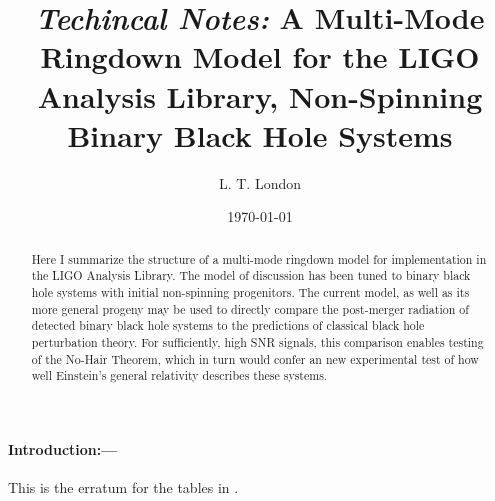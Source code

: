 \documentclass[twocolumn,prd,floatfix,preprintnumbers,a4paper,nofootinbib,superscriptaddress]{revtex4-1}
\begin{document}

\title{\textit{Techincal Notes:} A Multi-Mode Ringdown Model for the LIGO Analysis Library, Non-Spinning Binary Black Hole Systems}

\author{L. T. London}

\begin{abstract}
	Here I summarize the structure of a multi-mode ringdown model for implementation in the LIGO Analysis Library. The model of discussion has been tuned to binary black hole systems with initial non-spinning progenitors. The current model, as well as its more general progeny may be used to directly compare the post-merger radiation of detected binary black hole systems to the predictions of classical black hole perturbation theory. For sufficiently, high SNR signals, this comparison enables testing of the No-Hair Theorem, which in turn would confer an new experimental test of how well Einstein's general relativity describes these systems.
\end{abstract}

\date{\today}

\maketitle

\paragraph{Introduction:---}
%
\par This is the erratum for the tables in \cite{London:2014cma}.



\end{document}
